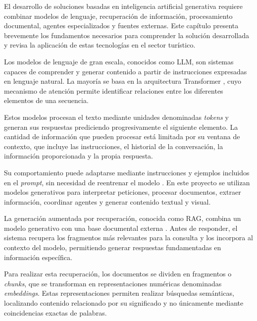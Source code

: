 \newpage
{}

El desarrollo de soluciones basadas en inteligencia artificial generativa requiere combinar modelos de lenguaje, recuperación de información, procesamiento documental, agentes especializados y fuentes externas. Este capítulo presenta brevemente los fundamentos necesarios para comprender la solución desarrollada y revisa la aplicación de estas tecnologías en el sector turístico.

Los modelos de lenguaje de gran escala, conocidos como LLM, son sistemas capaces de comprender y generar contenido a partir de instrucciones expresadas en lenguaje natural. La mayoría se basa en la arquitectura Transformer \parencite{vaswani2017attention}, cuyo mecanismo de atención permite identificar relaciones entre los diferentes elementos de una secuencia.

Estos modelos procesan el texto mediante unidades denominadas \textit{tokens} y generan sus respuestas prediciendo progresivamente el siguiente elemento. La cantidad de información que pueden procesar está limitada por su ventana de contexto, que incluye las instrucciones, el historial de la conversación, la información proporcionada y la propia respuesta.

Su comportamiento puede adaptarse mediante instrucciones y ejemplos incluidos en el \textit{prompt}, sin necesidad de reentrenar el modelo \parencite{brown2020fewshot}. En este proyecto se utilizan modelos generativos para interpretar peticiones, procesar documentos, extraer información, coordinar agentes y generar contenido textual y visual.

La generación aumentada por recuperación, conocida como RAG, combina un modelo generativo con una base documental externa \parencite{lewis2020rag}. Antes de responder, el sistema recupera los fragmentos más relevantes para la consulta y los incorpora al contexto del modelo, permitiendo generar respuestas fundamentadas en información específica.

Para realizar esta recuperación, los documentos se dividen en fragmentos o \textit{chunks}, que se transforman en representaciones numéricas denominadas \textit{embeddings}. Estas representaciones permiten realizar búsquedas semánticas, localizando contenido relacionado por su significado y no únicamente mediante coincidencias exactas de palabras.

